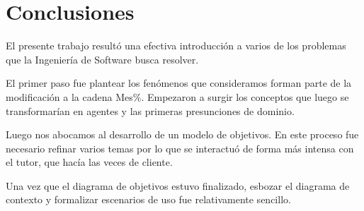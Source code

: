 
\section{Conclusiones}
El presente trabajo resultó una efectiva introducción a varios de los problemas que la Ingeniería de Software busca resolver.

El primer paso fue plantear los fenómenos que consideramos forman parte de la modificación a la cadena Mes\%. Empezaron a surgir los conceptos que luego se transformarían en agentes y las primeras presunciones de dominio.

Luego nos abocamos al desarrollo de un modelo de objetivos. En este proceso fue necesario refinar varios temas por lo que se interactuó de forma más intensa con el tutor, que hacía las veces de cliente.

Una vez que el diagrama de objetivos estuvo finalizado, esbozar el diagrama de contexto y formalizar escenarios de uso fue relativamente sencillo.
